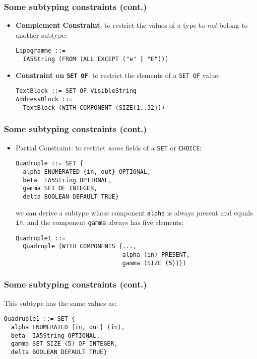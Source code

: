 \documentclass[compress,dvips,xcolor={dvipsnames},t]{beamer}
\begin{document}
\begin{frame}[containsverbatim]
\frametitle{Some subtyping constraints (cont.)}

\begin{itemize}

  \item \textbf{Complement Constraint}: to restrict the values of a
        type to \emph{not} belong to another subtype:

\begin{verbatim}
Lipogramme ::=
  IA5String (FROM (ALL EXCEPT ("e" | "E")))
\end{verbatim}

\bigskip\bigskip

  \item \textbf{Constraint on \texttt{SET OF}}: to restrict the
        elements of a \texttt{SET OF} value:

\begin{verbatim}
TextBlock ::= SET OF VisibleString
AddressBlock ::=
  TextBlock (WITH COMPONENT (SIZE(1..32)))
\end{verbatim}

\end{itemize}

\end{frame}

\begin{frame}[containsverbatim]
\frametitle{Some subtyping constraints (cont.)}

\begin{itemize}
  \item \textsf{Partial Constraint}: to restrict \emph{some} fields
        of a \texttt{SET} or \texttt{CHOICE}:

\begin{verbatim}
Quadruple ::= SET {
  alpha ENUMERATED {in, out} OPTIONAL,
  beta  IA5String OPTIONAL,
  gamma SET OF INTEGER,
  delta BOOLEAN DEFAULT TRUE}
\end{verbatim}

we can derive a subtype whose component \verb+alpha+ is always present
and equals \verb+in+, and the component \verb+gamma+ always has
five elements:
\begin{verbatim}
Quadruple1 ::=
  Quadruple (WITH COMPONENTS {..., 
                              alpha (in) PRESENT,  
                              gamma (SIZE (5))})
\end{verbatim}

\end{itemize}

\end{frame}

\begin{frame}[containsverbatim]
\frametitle{Some subtyping constraints (cont.)}

This subtype has the same values as:
\begin{verbatim}
Quadruple1 ::= SET {
  alpha ENUMERATED {in, out} (in),
  beta  IA5String OPTIONAL,
  gamma SET SIZE (5) OF INTEGER,
  delta BOOLEAN DEFAULT TRUE}
\end{verbatim}

\end{frame}
\end{document}
